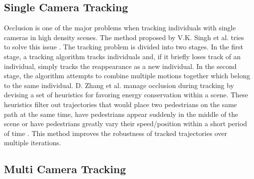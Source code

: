 \documentclass[12pt, onecolumn, conference]{IEEEtran}
\begin{document}
\subsection{Single Camera Tracking}

Occlusion is one of the major problems when tracking individuals with single cameras in high density scenes. The method proposed by V.K. Singh et al. tries to solve this issue \cite{V.K. Singh}. The tracking problem is divided into two stages. In the first stage, a tracking algorithm tracks individuals and, if it briefly loses track of an individual, simply tracks the reappearance as a new individual. In the second stage, the algorithm attempts to combine multiple motions together which belong to the same individual.
D. Zhang et al. manage occlusion during tracking by devising a set of heuristics for favoring energy conservation within a scene. These heuristics filter out trajectories that would place two pedestrians on the same path at the same time, have pedestrians appear suddenly in the middle of the scene or have pedestrians greatly vary their speed/position within a short period of time \cite{D. Zhang}. This method improves the robustness of tracked trajectories over multiple iterations.

\subsection{Multi Camera Tracking}
\end{document}
